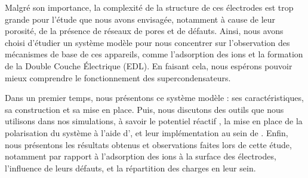 Malgré son importance, la complexité de la structure de ces électrodes est trop grande pour l'étude que nous avons envisagée, notamment à cause de leur porosité, de la présence de réseaux de pores et de défauts\cite{bo_design_2018}. Ainsi, nous avons choisi d'étudier un système modèle pour nous concentrer sur l'observation des mécanismes de base de ces appareils, comme l'adsorption des ions et la formation de la Double Couche Électrique (EDL). En faisant cela, nous espérons pouvoir mieux comprendre le fonctionnement des supercondensateurs.

Dans un premier temps, nous présentons ce système modèle : ses caractéristiques, sa construction et sa mise en place.
Puis, nous discutons des outils que nous utilisons dans nos simulations, à savoir le potentiel réactif \reaxff{}\cite{van_duin_reaxff_2001}\cite{russo_atomistic-scale_2011}\cite{senftle_reaxff_2016}, la mise en place de la polarisation du système à l'aide d'\echemdid{}\cite{onofrio_voltage_2015}, et leur implémentation au sein de \lammps{}.
Enfin, nous présentons les résultats obtenus et observations faites lors de cette étude, notamment par rapport à l'adsorption des ions à la surface des électrodes, l'influence de leurs défauts, et la répartition des charges en leur sein.
